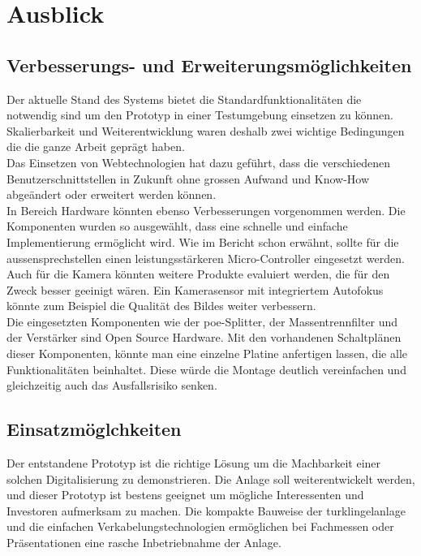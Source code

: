 \section{Ausblick}
\label{sec:ausblick}
\subsection{Verbesserungs- und Erweiterungsmöglichkeiten}
\label{sec:erweiterungen}
Der aktuelle Stand des Systems bietet die Standardfunktionalitäten die notwendig sind um den Prototyp in einer Testumgebung einsetzen zu können. Skalierbarkeit und Weiterentwicklung waren deshalb zwei wichtige Bedingungen die die ganze Arbeit geprägt haben.
\\
Das Einsetzen von Webtechnologien hat dazu geführt, dass die verschiedenen Benutzerschnittstellen in Zukunft ohne grossen Aufwand und Know-How abgeändert oder erweitert werden können.
\\
In Bereich Hardware könnten ebenso Verbesserungen vorgenommen werden. Die Komponenten wurden so ausgewählt, dass eine schnelle und einfache Implementierung ermöglicht wird. Wie im Bericht schon erwähnt, sollte für die \gls{aussensprechstelle}n einen leistungsstärkeren Micro-Controller eingesetzt werden. Auch für die Kamera könnten weitere Produkte evaluiert werden, die für den Zweck besser geeinigt wären. Ein Kamerasensor mit integriertem Autofokus könnte zum Beispiel die Qualität des Bildes weiter verbessern.
\\
Die eingesetzten Komponenten wie der \gls{poe}-Splitter, der Massentrennfilter und der Verstärker sind Open Source Hardware. Mit den vorhandenen Schaltplänen dieser Komponenten, könnte man eine einzelne Platine anfertigen lassen, die alle Funktionalitäten beinhaltet. Diese würde die Montage deutlich vereinfachen und gleichzeitig auch das Ausfallsrisiko senken.
\\

\subsection{Einsatzmöglchkeiten}
\label{sec:eisatz}
Der entstandene Prototyp ist die richtige Lösung um die Machbarkeit einer solchen Digitalisierung zu demonstrieren. Die Anlage soll weiterentwickelt werden, und dieser Prototyp ist bestens geeignet um mögliche Interessenten und Investoren aufmerksam zu machen. Die kompakte Bauweise der \gls{turklingelanlage} und die einfachen Verkabelungstechnologien ermöglichen bei Fachmessen oder Präsentationen eine rasche Inbetriebnahme der Anlage.

